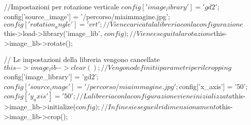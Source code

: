\begin{code}
//Impostazioni per rotazione verticale  
$config['image_library'] = 'gd2';  
$config['source_image'] = '/percorso/miaimmagine.jpg';  
$config['rotation_angle'] = 'vrt';

// Viene caricata la libreria con la configurazione  
$this->load->library('image_lib', $config);  

// Viene eseguita la rotazione
$this->image_lib->rotate();

// Le impostazioni della libreria vengono cancellate
$this->image_lib->clear(); 

// Vengono definiti i parametri per il cropping
$config['image_library'] = 'gd2';  
$config['source_image'] = '/percorso/miaimmagine.jpg';  
$config['x_axis'] = '50';  
$config['y_axis'] = '50';

// La libreria con la configurazione viene inizializzata
$this->image_lib->initialize($config); 

// Infine si esegue il ridimensionamento
$this->image_lib->crop();  
\end{code}